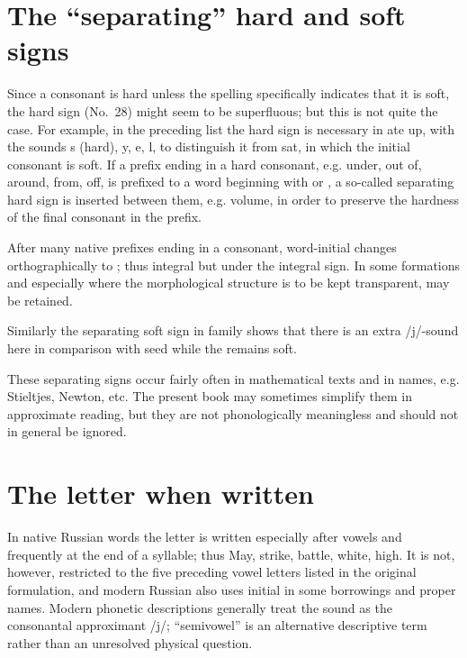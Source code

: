 \section{The ``separating'' hard and soft signs}

Since a consonant is hard unless the spelling specifically indicates that it is soft, the hard sign  (No.~28) might seem to be superfluous; but this is not quite the case. For example, in the preceding list the hard sign is necessary in  ate up, with the sounds s (hard), y, e, l, to distinguish it from  sat, in which the initial consonant is soft. If a prefix ending in a hard consonant, e.g.  under,  out of,  around,  from,  off, is prefixed to a word beginning with  or , a so-called separating hard sign is inserted between them, e.g.  volume, in order to preserve the hardness of the final consonant in the prefix.

After many native prefixes ending in a consonant, word-initial  changes orthographically to ; thus  integral but  under the integral sign. In some formations and especially where the morphological structure is to be kept transparent,  may be retained.

Similarly the separating soft sign in  family shows that there is an extra /j/-sound here in comparison with  seed while the  remains soft.

These separating signs occur fairly often in mathematical texts and in names, e.g.  Stieltjes,  Newton, etc. The present book may sometimes simplify them in approximate reading, but they are not phonologically meaningless and should not in general be ignored.

\section{The letter  when written}

In native Russian words the letter  is written especially after vowels and frequently at the end of a syllable; thus  May,  strike,  battle,  white,  high. It is not, however, restricted to the five preceding vowel letters listed in the original formulation, and modern Russian also uses initial  in some borrowings and proper names. Modern phonetic descriptions generally treat the sound as the consonantal approximant /j/; ``semivowel'' is an alternative descriptive term rather than an unresolved physical question.

